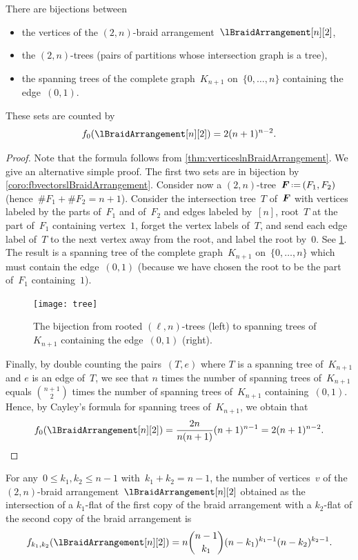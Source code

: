 \begin{theorem}
\label{thm:vertices2nBraidArrangement}
There are bijections between
\begin{itemize}
\item the vertices of the $(2,n)$-braid arrangement~$\lBraidArrangement[n][2]$,
\item the $(2,n)$-trees (\ie pairs of partitions whose intersection graph is a tree),
\item the spanning trees of the complete graph~$K_{n+1}$ on~$\{0, \dots, n\}$ containing the edge~$(0,1)$.
\end{itemize}
These sets are counted by
\[
f_0(\lBraidArrangement[n][2]) = 2 (n + 1)^{n-2}.
\]
\end{theorem}

\begin{proof}
Note that the formula follows from \cref{thm:verticeslnBraidArrangement}.
We give an alternative simple proof.
The first two sets are in bijection by \cref{coro:fbvectorslBraidArrangement}.
Consider now a $(2,n)$-tree~$\b{F} \eqdef (F_1,F_2)$ (hence~$\# F_1 + \# F_2 = n + 1$).
Consider the intersection tree~$T$ of~$\boldsymbol{F}$ with vertices labeled by the parts of~$F_1$ and of~$F_2$ and edges labeled by~$[n]$, root~$T$ at the part of~$F_1$ containing vertex~$1$, forget the vertex labels of~$T$, and send each edge label of~$T$ to the next vertex away from the root, and label the root by~$0$.
See \cref{fig:tree}.
The result is a spanning tree of the complete graph~$K_{n+1}$ on~$\{0, \dots, n\}$ which must contain the edge~$(0,1)$ (because we have chosen the root to be the part of~$F_1$ containing~$1$).
%
\begin{figure}
	\centerline{\texttt{[image: tree]}}
	\caption{The bijection from rooted $(\ell,n)$-trees (left) to spanning trees of~$K_{n+1}$ containing the edge~$(0,1)$ (right).}
	\label{fig:tree}
\end{figure}
%
Finally, by double counting the pairs~$(T,e)$ where $T$ is a spanning tree of~$K_{n+1}$ and $e$ is an edge of~$T$, we see that $n$ times the number of spanning trees of~$K_{n+1}$ equals $\binom{n+1}{2}$ times the number of spanning trees of~$K_{n+1}$ containing~$(0,1)$.
Hence, by Cayley's formula for spanning trees of~$K_{n+1}$, we obtain that
\[
f_0(\lBraidArrangement[n][2]) = \frac{2n}{n(n+1)} (n+1)^{n-1} = 2 (n + 1)^{n-2}.
\qedhere
\]
\end{proof}

\begin{theorem}
\label{thm:verticesRefined2BraidArrangement}
For any~$0 \le k_1, k_2 \le n-1$ with~$k_1 + k_2 = n-1$, the number of vertices~$v$ of the $(2,n)$-braid arrangement~$\lBraidArrangement[n][2]$ obtained as the intersection of a $k_1$-flat of the first copy of the braid arrangement with a $k_2$-flat of the second copy of the braid arrangement is
\[
f_{k_1, k_2}(\lBraidArrangement[n][2]) = n \binom{n-1}{k_1} (n-k_1)^{k_1-1} (n-k_2)^{k_2-1}.
\]
\end{theorem}

